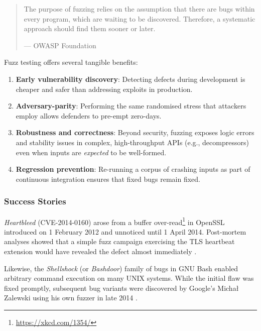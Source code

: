 \documentclass[
  a4paper,
  DIV=11,
  numbers=noendperiod]{scrreprt}
\providecommand{\tightlist}{%
  \setlength{\itemsep}{0pt}\setlength{\parskip}{0pt}}
\theoremstyle{definition}
\theoremstyle{remark}
\begin{document}
\begin{quote}
The purpose of fuzzing relies on the assumption that there are bugs
within every program, which are waiting to be discovered. Therefore, a
systematic approach should find them sooner or later.

--- OWASP Foundation \autocite{owaspfoundation}
\end{quote}

Fuzz testing offers several tangible benefits:

\begin{enumerate}
\def\labelenumi{\arabic{enumi}.}
\tightlist
\item
  \textbf{Early vulnerability discovery}: Detecting defects during
  development is cheaper and safer than addressing exploits in
  production.
\item
  \textbf{Adversary-parity}: Performing the same randomised stress that
  attackers employ allows defenders to pre-empt zero-days.
\item
  \textbf{Robustness and correctness}: Beyond security, fuzzing exposes
  logic errors and stability issues in complex, high-throughput APIs
  (e.g., decompressors) even when inputs are \emph{expected} to be
  well-formed.
\item
  \textbf{Regression prevention}: Re-running a corpus of crashing inputs
  as part of continuous integration ensures that fixed bugs remain
  fixed.
\end{enumerate}

\subsubsection{Success Stories}\label{success-stories}

\emph{Heartbleed} (CVE-2014-0160) \autocite{heartbleed,heartbleed-cve}
arose from a buffer over-read\footnote{\url{https://xkcd.com/1354/}} in
OpenSSL \autocite{theopensslproject2025} introduced on 1 February 2012
and unnoticed until 1 April 2014. Post-mortem analyses showed that a
simple fuzz campaign exercising the TLS heartbeat extension would have
revealed the defect almost immediately \autocite{wheeler2014}.

Likewise, the \emph{Shellshock} (or \emph{Bashdoor}) family of bugs in
GNU Bash \autocite{bash} enabled arbitrary command execution on many
UNIX systems. While the initial flaw was fixed promptly, subsequent bug
variants were discovered by Google's Michał Zalewski using his own
fuzzer \autocite{afl} in late 2014 \autocite{saarinen2014}.
\end{document}

